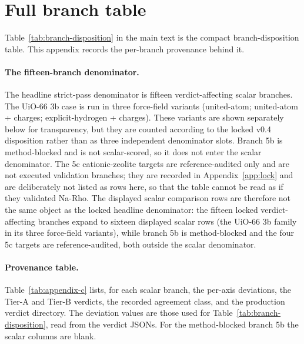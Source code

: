\section{Full branch table}\label{app:branch-table}

Table~\ref{tab:branch-disposition} in the main text is the compact branch-disposition table. This appendix records the per-branch provenance behind it.

\paragraph{The fifteen-branch denominator.} The headline strict-pass denominator is fifteen verdict-affecting scalar branches. The UiO-66 3b case is run in three force-field variants (united-atom; united-atom + charges; explicit-hydrogen + charges). These variants are shown separately below for transparency, but they are counted according to the locked v0.4 disposition rather than as three independent denominator slots. Branch 5b is method-blocked and is not scalar-scored, so it does not enter the scalar denominator. The 5c cationic-zeolite targets are reference-audited only and are not executed validation branches; they are recorded in Appendix~\ref{app:lock} and are deliberately not listed as rows here, so that the table cannot be read as if they validated Na-Rho. The displayed scalar comparison rows are therefore not the same object as the locked headline denominator: the fifteen locked verdict-affecting branches expand to sixteen displayed scalar rows (the UiO-66 3b family in its three force-field variants), while branch 5b is method-blocked and the four 5c targets are reference-audited, both outside the scalar denominator.

\paragraph{Provenance table.} Table~\ref{tab:appendix-c} lists, for each scalar branch, the per-axis deviations, the Tier-A and Tier-B verdicts, the recorded agreement class, and the production verdict directory. The deviation values are those used for Table~\ref{tab:branch-disposition}, read from the verdict JSONs. For the method-blocked branch 5b the scalar columns are blank.

